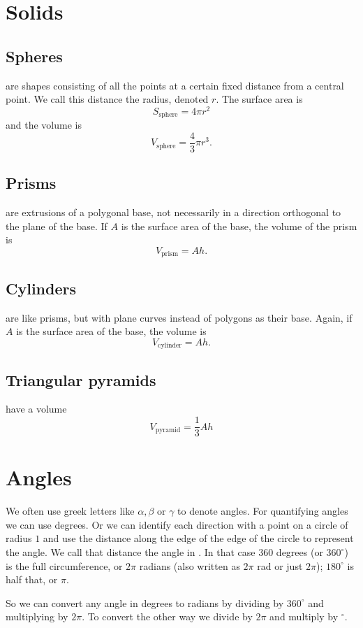 \section{Solids}
\subsection{Spheres} are shapes consisting of all the points at a certain fixed distance from a central point. We call this distance the radius, denoted $r$. The surface area is
\[ S_\text{sphere} = 4\pi r^2 \]
and the volume is
\[V_\text{sphere} = \frac{4}{3}\pi r^3.\]

\subsection{Prisms} are extrusions of a polygonal base, not necessarily in a direction orthogonal to the plane of the base. If $A$ is the surface area of the base, the volume of the prism is
\[V_\text{prism} = Ah. \]

\subsection{Cylinders} are like prisms, but with plane curves instead of polygons as their base. Again, if $A$ is the surface area of the base, the volume is
\[ V_\text{cylinder} = Ah. \]

\subsection{Triangular pyramids} have a volume
\[ V_\text{pyramid} = \frac{1}{3}Ah \]

\section{Angles}
We often use greek letters like $\alpha, \beta$ or $\gamma$ to denote angles. For quantifying angles we can use degrees. Or we can identify each direction with a point on a circle of radius $1$ and use the distance along the edge of the edge of the circle to represent the angle. We call that distance the angle in . In that case $360$ degrees (or $360^\circ$) is the full circumference, or $2\pi$ radians (also written as $2\pi$ rad or just $2\pi$); $180^\circ$ is half that, or $\pi$.

So we can convert any angle in degrees to radians by dividing by $360^\circ$ and multiplying by $2\pi$. To convert the other way we divide by $2\pi$ and multiply by $^\circ$.

